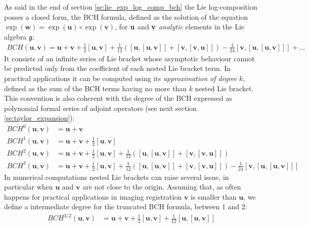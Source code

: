 As said in the end of section \ref{se:lie_exp_log_comp_bch} the Lie log-composition posses a closed form, the BCH formula, defined as the solution of the equation $\exp(\mathbf{w}) = \exp(\mathbf{u}) \circ \exp(\mathbf{v})$, for $\bf{u}$ and $\bf{v}$ \emph{analytic} elements in the Lie algebra $\mathfrak{g}$:
\begin{align}\label{eq:bch_definition}
	BCH(\mathbf{u},\mathbf{v}) 
	= 
	\mathbf{u} + \mathbf{v} + \frac{1}{2}[\mathbf{u},\mathbf{v}] + \frac{1}{12}([\mathbf{u},[\mathbf{u},\mathbf{v}]]
	+ [\mathbf{v},[\mathbf{v},\mathbf{u}]]) - \frac{1}{24}[\mathbf{v},[\mathbf{u},[\mathbf{u},\mathbf{v}]]] +... 
\end{align}
It consists of an infinite series of Lie bracket whose asymptotic behaviour cannot be predicted only from the coefficient of each nested Lie bracket term. In practical applications it can be computed using its \emph{approximation of degree} $k$, defined as the sum of the BCH terms having no more than $k$ nested Lie bracket. This convention is also coherent with the degree of the BCH expressed as polynomial formal series of adjoint operators (see next section \ref{se:taylor_expansion}):
\begin{align*}
BCH^{0}(\mathbf{u},\mathbf{v}) &= \mathbf{u} + \mathbf{v} \\
BCH^{1}(\mathbf{u},\mathbf{v}) &=  \mathbf{u} + \mathbf{v} + \frac{1}{2}[\mathbf{u},\mathbf{v}] \\
BCH^{2}(\mathbf{u},\mathbf{v}) &=  \mathbf{u} + \mathbf{v} + \frac{1}{2}[\mathbf{u},\mathbf{v}] + \frac{1}{12}([\mathbf{u},[\mathbf{u},\mathbf{v}]] + [\mathbf{v},[\mathbf{v},\mathbf{u}]]) \\
BCH^{3}(\mathbf{u},\mathbf{v}) &=  \mathbf{u} + \mathbf{v} + \frac{1}{2}[\mathbf{u},\mathbf{v}] + \frac{1}{12}([\mathbf{u},[\mathbf{u},\mathbf{v}]] + [\mathbf{v},[\mathbf{v},\mathbf{u}]])- \frac{1}{24}[\mathbf{v},[\mathbf{u},[\mathbf{u},\mathbf{v}]]] 
\end{align*}
In numerical computations nested Lie brackets can raise several issue, in particular when $\mathbf{u}$ and $\mathbf{v}$ are not close to the origin. Assuming that, as often happens for practical applications in imaging registration $\mathbf{v}$ is smaller than $\mathbf{u}$, we define a intermediate degree for the truncated BCH formula, between $1$ and $2$:
\begin{align*}
BCH^{3/2}(\mathbf{u},\mathbf{v}) &=  \mathbf{u} + \mathbf{v} + \frac{1}{2}[\mathbf{u},\mathbf{v}] + \frac{1}{12}[\mathbf{u},[\mathbf{u},\mathbf{v}]]
\end{align*}

